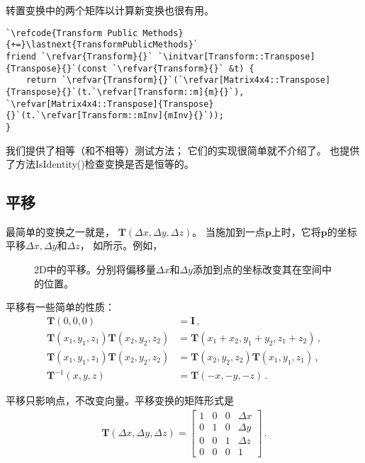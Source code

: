 转置变换中的两个矩阵以计算新变换也很有用。
\begin{lstlisting}
`\refcode{Transform Public Methods}{+=}\lastnext{TransformPublicMethods}`
friend `\refvar{Transform}{}` `\initvar[Transform::Transpose]{Transpose}{}`(const `\refvar{Transform}{}` &t) {
    return `\refvar{Transform}{}`(`\refvar[Matrix4x4::Transpose]{Transpose}{}`(t.`\refvar[Transform::m]{m}{}`), `\refvar[Matrix4x4::Transpose]{Transpose}{}`(t.`\refvar[Transform::mInv]{mInv}{}`));
}
\end{lstlisting}

我们提供了相等（和不相等）测试方法；
它们的实现很简单就不介绍了。
也提供了方法{\ttfamily IsIdentity()}检查变换是否是恒等的。

\subsection{平移}\label{sub:平移}
最简单的变换之一就是，
$\bm T(\Delta x,\Delta y, \Delta z)$。
当施加到一点$\bm p$上时，它将$\bm p$的坐标平移$\Delta x,\Delta y$和$\Delta z$，
如所示。例如，
\begin{figure}[htbp]
    \centering
    \caption{2D中的平移。分别将偏移量$\Delta x$和$\Delta y$添加到点的坐标改变其在空间中的位置。}
    \label{fig:2.10}
\end{figure}

平移有一些简单的性质：
\begin{align*}
    \bm T(0,0,0)                         & =\bm I\, ,                                \\
    \bm T(x_1,y_1,z_1)\bm T(x_2,y_2,z_2) & =\bm T(x_1+x_2,y_1+y_2,z_1+z_2)\, ,       \\
    \bm T(x_1,y_1,z_1)\bm T(x_2,y_2,z_2) & =\bm T(x_2,y_2,z_2)\bm T(x_1,y_1,z_1)\, , \\
    \bm T^{-1}(x,y,z)                    & =\bm T(-x,-y,-z)\, .
\end{align*}

平移只影响点，不改变向量。平移变换的矩阵形式是
\begin{align*}
    \bm T(\Delta x,\Delta y, \Delta z)=\left[
        \begin{array}{cccc}
            1 & 0 & 0 & \Delta x \\
            0 & 1 & 0 & \Delta y \\
            0 & 0 & 1 & \Delta z \\
            0 & 0 & 0 & 1
        \end{array}
        \right]\, .
\end{align*}

